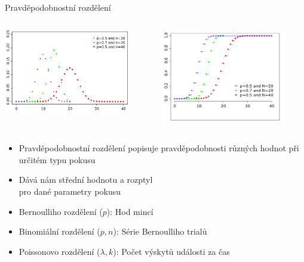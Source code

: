 \documentclass{beamer}
\begin{document}
\subsection{}
\begin{frame}{Pravděpodobnostní rozdělení}
\begin{columns}
\begin{column}{5.5cm}
\includegraphics[width=5.5cm]{Binomial_distribution_pmf.pdf}
\end{column}
\begin{column}{5.5cm}
\includegraphics[width=5.5cm]{Binomial_distribution_cdf.pdf}
\end{column}
\end{columns}
\begin{itemize}
\item Pravděpodobnostní rozdělení popisuje pravděpodobnosti různých hodnot při určitém typu pokusu
\item Dává nám střední hodnotu a rozptyl \\ pro dané parametry pokusu
\item Bernoulliho rozdělení ($p$): Hod mincí
\item Binomiální rozdělení ($p,n$): Série Bernoulliho trialů
\item Poissonovo rozdělení ($\lambda,k$): Počet výskytů události za čas
\end{itemize}
\end{frame}
\end{document}
